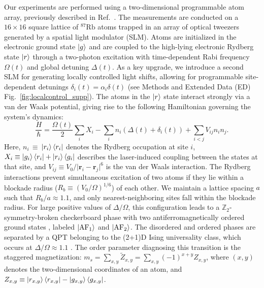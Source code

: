\documentclass[reprint,twocolumn,secnumarabic,amssymb, aps, prx]{revtex4-2}
\begin{document}
Our experiments are performed using a two-dimensional programmable atom array, previously described in Ref.~\cite{ebadi2021quantum}. The measurements are conducted on a $16\times16$ square lattice of  $^{87}\textrm{Rb}$ atoms trapped in an array of optical tweezers generated by a spatial light modulator (SLM). Atoms are initialized in the electronic ground state $\ket{g}$ and are coupled to the high-lying electronic Rydberg state $\ket{r}$ through a two-photon excitation with time-dependent Rabi frequency $\Omega (t)$ and global detuning $\Delta (t)$. As a key upgrade, we introduce a second SLM for generating locally controlled light shifts, allowing for programmable site-dependent detunings $\delta_i (t) = \alpha_i \delta (t)$ (see Methods and Extended Data (ED) Fig.~\ref{fig:localcontrol_supp}).
The atoms in the $\ket{r}$ state interact strongly  via a van der Waals potential, giving rise to the following Hamiltonian governing the system's dynamics:
\begin{equation}
    \frac{H}{\hbar} = \frac{\Omega(t)}{2}\sum_i X_i -  \sum_i n_i (\Delta(t) +\delta_i(t)) + \sum_{i<j} V_{ij}n_i n_j.
\label{eq:ryd_ham}
\end{equation}
Here, $n_i$\,$\equiv$\,$\ket{r_i}\bra{r_i}$ denotes the Rydberg occupation at site $i$, $X_i \equiv \ket{g_i}\bra{r_i}+\ket{r_i}\bra{g_i}$ describes the laser-induced coupling between the states at that site, and $V_{ij} \equiv V_0/\lvert \boldsymbol{r}_i - \boldsymbol{r}_j \rvert^6$ is the van der Waals interaction. The Rydberg interactions prevent simultaneous excitation of two atoms if they lie within a blockade radius ($R_b \equiv (V_0/\Omega)^{1/6}$) of each other. We maintain a lattice spacing $a$ such that $R_b/a\approx1.1$, and only nearest-neighboring sites fall within the blockade radius. For large positive values of $\Delta/\Omega$, this configuration leads to a $\mathbb{Z}_2$-symmetry-broken checkerboard phase with two antiferromagnetically ordered ground states \cite{PhysRevLett.124.103601}, labeled $\ket{\textrm{AF}_1}$ and $\ket{\textrm{AF}_2}$. The disordered and ordered phases are separated by a QPT belonging to the (2+1)D Ising universality class, which occurs at $\Delta/\Omega\approx 1.1$ \cite{PhysRevLett.124.103601,Kalinowski2022,ebadi2021quantum}.  The order parameter diagnosing this transition is the staggered magnetization: $m_s=\sum_{x,y}\tilde{Z}_{x,y}=\sum_{x,y}(-1)^{x+y} Z_{x,y}$, where $(x,y)$ denotes the two-dimensional coordinates of an atom, and $Z_{x,y} \equiv \ket{r_{x,y}}\bra{r_{x,y}}-\ket{g_{x,y}}\bra{g_{x,y}}$.
\end{document}
